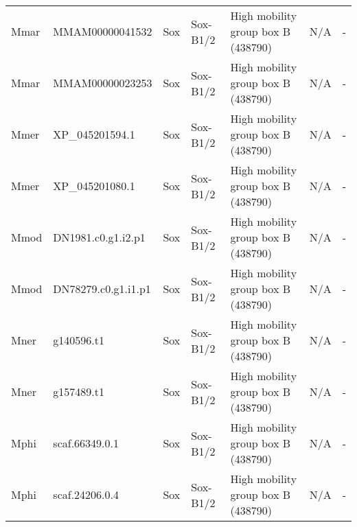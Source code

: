\documentclass[../main.tex]{subfiles}
\begin{document}
\begin{landscape}
\begin{longtable}{lllllll}
		Mmar           & MMAM00000041532       & Sox            & Sox-B1/2            & High mobility group box B (438790)          & N/A                                                                    & -                    \\
		Mmar           & MMAM00000023253       & Sox            & Sox-B1/2            & High mobility group box B (438790)          & N/A                                                                    & -                    \\
		Mmer           & XP\_045201594.1       & Sox            & Sox-B1/2            & High mobility group box B (438790)          & N/A                                                                    & -                    \\
		Mmer           & XP\_045201080.1       & Sox            & Sox-B1/2            & High mobility group box B (438790)          & N/A                                                                    & -                    \\
		Mmod           & DN1981.c0.g1.i2.p1    & Sox            & Sox-B1/2            & High mobility group box B (438790)          & N/A                                                                    & -                    \\
		Mmod           & DN78279.c0.g1.i1.p1   & Sox            & Sox-B1/2            & High mobility group box B (438790)          & N/A                                                                    & -                    \\
		Mner           & g140596.t1            & Sox            & Sox-B1/2            & High mobility group box B (438790)          & N/A                                                                    & -                    \\
		Mner           & g157489.t1            & Sox            & Sox-B1/2            & High mobility group box B (438790)          & N/A                                                                    & -                    \\
		Mphi           & scaf.66349.0.1        & Sox            & Sox-B1/2            & High mobility group box B (438790)          & N/A                                                                    & -                    \\
		Mphi           & scaf.24206.0.4        & Sox            & Sox-B1/2            & High mobility group box B (438790)          & N/A                                                                    & -                    \\

\end{longtable}
\end{landscape}
\end{document}
